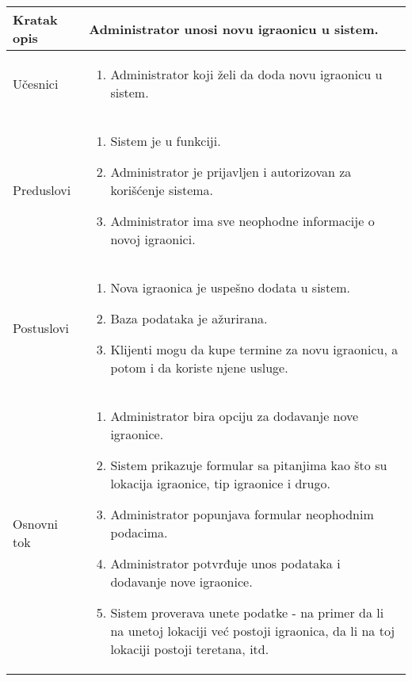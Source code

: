 \documentclass[../main.tex]{subfiles}
\begin{document}
\begin{longtable}{| p{} | p{} |} 

\hline
    Kratak opis & Administrator unosi novu igraonicu u sistem. \\ 
\hline    
    Učesnici & 
    	\begin{enumerate}
        \item Administrator koji želi da doda novu igraonicu u sistem.
     \end{enumerate}\\
\hline
   Preduslovi & \begin{enumerate}
       \item Sistem je u funkciji.
       \item Administrator je prijavljen i autorizovan za korišćenje sistema.
       \item Administrator ima sve neophodne informacije o novoj igraonici.
   \end{enumerate}\\
\hline  
    Postuslovi & \begin{enumerate}
        \item Nova igraonica je uspešno dodata u sistem.
        \item Baza podataka je ažurirana.
        \item Klijenti mogu da kupe termine za novu igraonicu, a potom i da koriste njene usluge.
    \end{enumerate}\\
\hline
    Osnovni tok & \begin{enumerate}
        \item Administrator bira opciju za dodavanje nove igraonice.
        \item Sistem prikazuje formular sa pitanjima kao što su lokacija igraonice, tip igraonice i drugo.
        \item Administrator popunjava formular neophodnim podacima.
        \item Administrator potvrđuje unos podataka i dodavanje nove igraonice. %
        \item Sistem proverava unete podatke - na primer da li na unetoj lokaciji već postoji igraonica, da li na toj lokaciji postoji teretana, itd. %

\end{enumerate}
\end{longtable}
\end{document}
